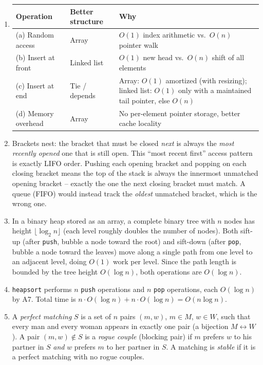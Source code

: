 \documentclass[11pt]{article}
\begin{document}
\begin{enumerate}[label=\textbf{A\arabic*.}, leftmargin=2.2em]
\item
\begin{center}
\begin{tabular}{@{}lll@{}}
\toprule
Operation & Better structure & Why \\
\midrule
(a) Random access      & Array       & $O(1)$ index arithmetic vs.\ $O(n)$ pointer walk \\
(b) Insert at front     & Linked list & $O(1)$ new head vs.\ $O(n)$ shift of all elements \\
(c) Insert at end        & Tie / depends & Array: $O(1)$ amortized (with resizing); linked
list: $O(1)$ only with a maintained tail pointer, else $O(n)$ \\
(d) Memory overhead      & Array       & No per-element pointer storage, better cache
locality \\
\bottomrule
\end{tabular}
\end{center}

\item Brackets nest: the bracket that must be closed \emph{next} is always the
\emph{most recently opened} one that is still open. This ``most recent first'' access
pattern is exactly LIFO order. Pushing each opening bracket and popping on each closing
bracket means the top of the stack is always the innermost unmatched opening bracket --
exactly the one the next closing bracket must match. A queue (FIFO) would instead track
the \emph{oldest} unmatched bracket, which is the wrong one.

\item In a binary heap stored as an array, a complete binary tree with $n$ nodes has
height $\lfloor \log_2 n \rfloor$ (each level roughly doubles the number of nodes). Both
sift-up (after \texttt{push}, bubble a node toward the root) and sift-down (after
\texttt{pop}, bubble a node toward the leaves) move along a single path from one level to
an adjacent level, doing $O(1)$ work per level. Since the path length is bounded by the
tree height $O(\log n)$, both operations are $O(\log n)$.

\item \texttt{heapsort} performs $n$ \texttt{push} operations and $n$ \texttt{pop}
operations, each $O(\log n)$ by A7. Total time is $n \cdot O(\log n) + n \cdot O(\log n) =
O(n \log n)$.

\item A \emph{perfect matching} $S$ is a set of $n$ pairs $(m,w)$, $m \in M$, $w \in W$,
such that every man and every woman appears in exactly one pair (a bijection $M
\leftrightarrow W$). A pair $(m,w) \notin S$ is a \emph{rogue couple} (blocking pair) if
$m$ prefers $w$ to his partner in $S$ \emph{and} $w$ prefers $m$ to her partner in $S$. A
matching is \emph{stable} if it is a perfect matching with no rogue couples.


\end{enumerate}
\end{document}
